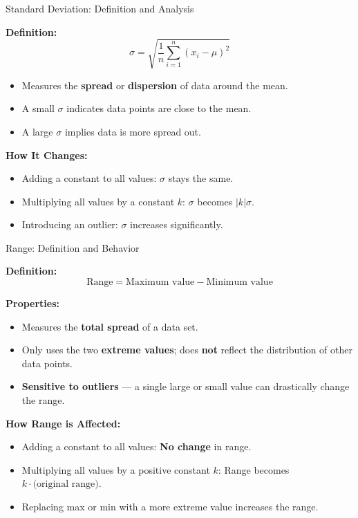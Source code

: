 \documentclass{beamer}
\begin{document}
\begin{frame}{Standard Deviation: Definition and Analysis}
\small

\textbf{Definition:}
\[
\sigma = \sqrt{\frac{1}{n} \sum_{i=1}^n (x_i - \mu)^2}
\]
\begin{itemize}
    \item Measures the \textbf{spread} or \textbf{dispersion} of data around the mean.
    \item A small $\sigma$ indicates data points are close to the mean.
    \item A large $\sigma$ implies data is more spread out.
\end{itemize}

\vspace{0.3cm}
\textbf{How It Changes:}
\begin{itemize}
    \item Adding a constant to all values: $\sigma$ stays the same.
    \item Multiplying all values by a constant $k$: $\sigma$ becomes $|k|\sigma$.
    \item Introducing an outlier: $\sigma$ increases significantly.
\end{itemize}

\end{frame}

\begin{frame}{Range: Definition and Behavior}
\small

\textbf{Definition:}
\[
\text{Range} = \text{Maximum value} - \text{Minimum value}
\]

\vspace{0.2cm}
\textbf{Properties:}
\begin{itemize}
    \item Measures the \textbf{total spread} of a data set.
    \item Only uses the two \textbf{extreme values}; does \textbf{not} reflect the distribution of other data points.
    \item \textbf{Sensitive to outliers} — a single large or small value can drastically change the range.
\end{itemize}

\vspace{0.2cm}
\textbf{How Range is Affected:}
\begin{itemize}
    \item Adding a constant to all values: \textbf{No change} in range.
    \item Multiplying all values by a positive constant $k$: Range becomes $k \cdot \text{(original range)}$.
    \item Replacing max or min with a more extreme value increases the range.
\end{itemize}
\end{frame}
\end{document}
